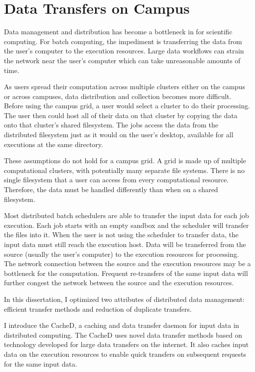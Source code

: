 




\section{Data Transfers on Campus}

Data management and distribution has become a bottleneck in for scientific computing.  For batch computing, the impediment is transferring the data from the user's computer to the execution resources.  Large data workflows can strain the network near the user's computer which can take unreasonable amounts of time.

As users spread their computation across multiple clusters either on the campus or across campuses, data distribution and collection becomes more difficult.  Before using the campus grid, a user would select a cluster to do their processing.  The user then could host all of their data on that cluster by copying the data onto that cluster's shared filesystem.  The jobs access the data from the distributed filesystem just as it would on the user's desktop, available for all executions at the same directory.

These assumptions do not hold for a campus grid.  A grid is made up of multiple computational clusters, with potentially many separate file systems.  There is no single filesystem that a user can access from every computational resource.  Therefore, the data must be handled differently than when on a shared filesystem.  


Most distributed batch schedulers are able to transfer the input data for each job execution.  Each job starts with an empty sandbox and the scheduler will transfer the files into it.  When the user is not using the scheduler to transfer data, the input data must still reach the execution host.  Data will be transferred from the source (usually the user's computer) to the execution resources for processing.  The network connection between the source and the execution resources may be a bottleneck for the computation.  Frequent re-transfers of the same input data will further congest the network between the source and the execution resources.

In this dissertation, I optimized two attributes of distributed data management: efficient transfer methods and reduction of duplicate transfers.

I introduce the CacheD, a caching and data transfer daemon for input data in distributed computing.  The CacheD uses novel data transfer methods based on technology developed for large data transfers on the internet.  It also caches input data on the execution resources to enable quick transfers on subsequent requests for the same input data.

